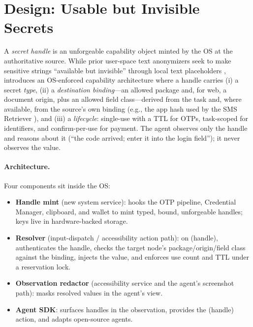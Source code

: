\section{Design: Usable but Invisible Secrets}
\label{sec:design}

A \emph{secret handle} is an unforgeable capability object minted by the OS at the authoritative source. While prior user-space text anonymizers seek to make sensitive strings ``available but invisible'' through local text placeholders \cite{zhao2026anonymization}, \SH{} introduces an OS-enforced capability architecture where a handle carries (i) a secret \emph{type}, (ii) a \emph{destination binding}---an allowed package and, for web, a document origin, plus an allowed field class---derived from the task and, where available, from the source's own binding (e.g., the app hash used by the SMS Retriever \cite{androidSmsRetriever}), and (iii) a \emph{lifecycle}: single-use with a TTL for OTPs, task-scoped for identifiers, and confirm-per-use for payment. The agent observes only the handle and reasons about it (``the code arrived; enter it into the login field''); it never observes the value.

\paragraph{Architecture.} Four components sit inside the OS:
\begin{itemize}[leftmargin=*]
  \item \textbf{Handle mint} (new system service): hooks the OTP pipeline, Credential Manager, clipboard, and wallet to mint typed, bound, unforgeable handles; keys live in hardware-backed storage.
  \item \textbf{Resolver} (input-dispatch / accessibility action path): on \Enter(handle), authenticates the handle, checks the target node's package/origin/field class against the binding, injects the value, and enforces use count and TTL under a reservation lock.
  \item \textbf{Observation redactor} (accessibility service and the agent's screenshot path): masks resolved values in the agent's view.
  \item \textbf{Agent SDK}: surfaces handles in the observation, provides the \Enter(handle) action, and adapts open-source agents.
\end{itemize}

